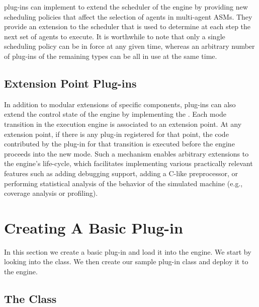 \documentclass{article}
\begin{document}
\CoreASM plug-ins can implement 
to extend the scheduler of the engine by providing new scheduling policies
that affect the selection of agents in multi-agent ASMs. They provide
an extension to the scheduler that is used to determine at each step the
next set of agents to execute.   
It is worthwhile to note that only a single scheduling policy can be in
force at any given time, whereas an arbitrary number of plug-ins of the
remaining types can be all in use at the same time.

\subsection{Extension Point Plug-ins}
\label{sec:extensionpoints}

In addition to modular extensions of specific components, plug-ins can
also extend the control state of the engine by implementing the
. 
Each mode transition in the execution
engine is associated to an extension point. At any extension point, if
there is any plug-in registered for that point, the code contributed by
the plug-in for that transition is executed before the engine proceeds
into the new mode.  Such a mechanism enables arbitrary extensions to the
engine's life-cycle, which facilitates implementing various practically
relevant features such as adding debugging support, adding a C-like
preprocessor, or performing statistical analysis of the behavior of the
simulated machine (e.g., coverage analysis or profiling). 

\section{Creating A Basic Plug-in}
\label{sec:basicplugin}

In this section we create a basic \CoreASM plug-in and load it into the engine. We start by looking into the 
 class. We then create our sample plug-in class and deploy it to the engine.

\subsection{The  Class}
\label{sec:pluginclass}
\end{document}
